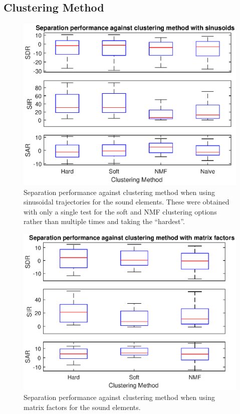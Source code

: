\documentclass[10pt,twoside,a4paper]{report}
\begin{document}
\subsection{Clustering Method}


\begin{figure}
\centering
\includegraphics[width=0.7\linewidth]{./ClusteringCompBoxPlotsSin}
\caption{Separation performance against clustering method when using sinusoidal trajectories for the sound elements. These were obtained with only a single test for the soft and NMF clustering options rather than multiple times and taking the ``hardest''.}
\label{fig:ClusteringCompBoxPlotsSin}
\end{figure}

\begin{figure}
\centering
\includegraphics[width=0.7\linewidth]{./ClusteringCompBoxPlotsMat}
\caption{Separation performance against clustering method when using matrix factors for the sound elements.}
\label{fig:ClusteringCompBoxPlotsMat}
\end{figure}

\end{document}
